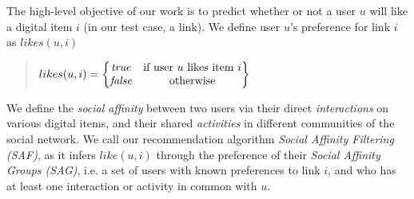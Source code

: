 

The high-level objective of our work is to predict whether or not a user $u$ will like a digital item $i$ (in our test case, a link). 
We define user $u$'s preference for link $i$ as $likes(u,i)$ 
\begin{quote}
\begin{math}
likes(u,i) =  \begin{Bmatrix}
	  \true & \text{if user $u$ likes item $i$}\\
	  \false & \text{otherwise}
	  \end{Bmatrix}
\end{math}
\end{quote}

We define the \textit{social affinity} between two users via their direct {\em interactions}
on various digital items, and their shared {\em activities} in different communities of the social network. 
We call our recommendation algorithm \textit{Social Affinity Filtering (SAF)}, as it infers 
$like(u,i)$ through the preference of their 
\textit{ Social Affinity Groups (SAG)}, i.e. a set of users with known preferences to link $i$, and who has at least one interaction or activity in common with $u$. 

